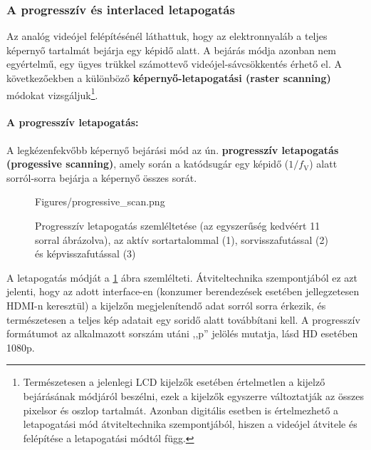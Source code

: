\subsubsection*{A progresszív és interlaced letapogatás}

Az analóg videójel felépítésénél láthattuk, hogy az elektronnyaláb a teljes képernyő tartalmát bejárja egy képidő alatt.
A bejárás módja azonban nem egyértelmű, egy ügyes trükkel számottevő videójel-sávcsökkentés érhető el.
A következőekben a különböző \textbf{képernyő-letapogatási (raster scanning)} módokat vizsgáljuk\footnote{Természetesen a jelenlegi LCD kijelzők esetében értelmetlen a kijelző bejárásának módjáról beszélni, ezek a kijelzők egyszerre változtatják az összes pixelsor és oszlop tartalmát.
Azonban digitális esetben is értelmezhető a letapogatási mód átviteltechnika szempontjából, hiszen a videójel átvitele és felépítése a letapogatási módtól függ.}.

\paragraph{A progresszív letapogatás:}
A legkézenfekvőbb képernyő bejárási mód az ún. \textbf{progresszív letapogatás (progessive scanning)}, amely során a katódsugár egy képidő ($1/f_{\mathrm{V}}$) alatt sorról-sorra bejárja a képernyő összes sorát.
\begin{figure}[]
	\centering
	\begin{minipage}[c]{0.6\textwidth}
	\begin{overpic}[width = 1\columnwidth ]{Figures/progressive_scan.png}
	\end{overpic}   \end{minipage}\hfill
		\begin{minipage}[c]{0.3\textwidth}
	\caption{Progresszív letapogatás szemléltetése (az egyszerűség kedvéért 11 sorral ábrázolva), az aktív sortartalommal (1), sorvisszafutással (2) és képvisszafutással (3)}
	\label{Fig:progressive}  \end{minipage}
\end{figure}
A letapogatás módját a \ref{Fig:progressive} ábra szemlélteti.
Átviteltechnika szempontjából ez azt jelenti, hogy az adott interface-en (konzumer berendezések esetében jellegzetesen HDMI-n keresztül) a kijelzőn megjelenítendő adat sorról sorra érkezik, és természetesen a teljes kép adatait egy soridő alatt továbbítani kell.
A progresszív formátumot az alkalmazott sorszám utáni ,,p'' jelölés mutatja, lásd HD esetében 1080p.

